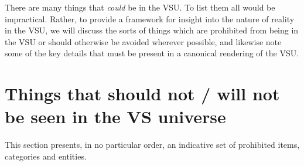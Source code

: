 \label{chapt:VSUreality}
There are many things that {\it could} be in the VSU. To list them all
would be impractical. Rather, to provide a framework for insight into
the nature of reality in the VSU, we will discuss the sorts of things
which are prohibited from being in the VSU or should otherwise be
avoided wherever possible, and likewise note some of the key details
that must be present in a canonical rendering of the VSU.

\section{Things that should not / will not be seen in the VS universe}
\label{subsec:thingsnotinVSU}
This section presents, in no particular order, an indicative set of
prohibited items, categories and entities.

